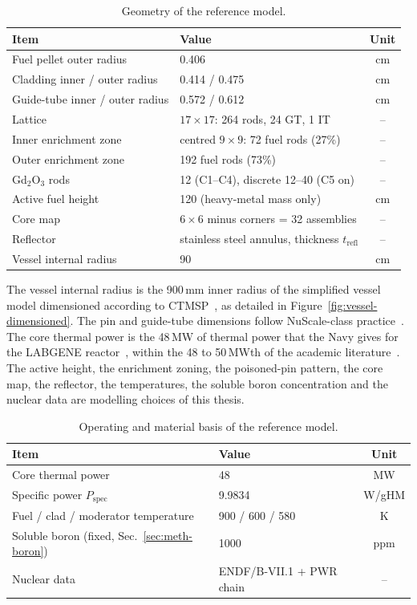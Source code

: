 \begin{table}[htbp]
  \centering
  \caption{Geometry of the reference model.}
  \label{tab:model-geometry}
  \begin{tabular}{llc}
    \toprule
    Item & Value & Unit \\
    \midrule
    Fuel pellet outer radius & 0.406 & cm \\
    Cladding inner / outer radius & 0.414 / 0.475 & cm \\
    Guide-tube inner / outer radius & 0.572 / 0.612 & cm \\
    Lattice & $17\times17$: 264 rods, 24 GT, 1 IT & -- \\
    Inner enrichment zone & centred $9\times9$: 72 fuel rods (27\%) & -- \\
    Outer enrichment zone & 192 fuel rods (73\%) & -- \\
    Gd$_2$O$_3$ rods & 12 (C1--C4), discrete 12--40 (C5 on) & -- \\
    Active fuel height & 120 (heavy-metal mass only) & cm \\
    Core map & $6\times6$ minus corners = 32 assemblies & -- \\
    Reflector & stainless steel annulus, thickness $t_\mathrm{refl}$ & -- \\
    Vessel internal radius & 90 & cm \\
    \bottomrule
  \end{tabular}
\end{table}

The vessel internal radius is the 900\,mm inner radius of the simplified
vessel model dimensioned according to CTMSP~\cite{maruyama_2013}, as
detailed in Figure~\ref{fig:vessel-dimensioned}. The pin
and guide-tube dimensions follow NuScale-class
practice~\cite{nuscale_htp2_2017}. The core thermal power is the
48\,MW of thermal power that the Navy gives for the LABGENE
reactor~\cite{demartini_nuclep_2022}, within the 48 to 50\,MWth of the
academic literature~\cite{dinizcosta_2017}. The active height, the
enrichment zoning, the poisoned-pin pattern, the core map, the
reflector, the temperatures, the soluble boron concentration and the
nuclear data are modelling choices of this thesis.

\begin{table}[htbp]
  \centering
  \caption{Operating and material basis of the reference model.}
  \label{tab:model-operating}
  \begin{tabular}{llc}
    \toprule
    Item & Value & Unit \\
    \midrule
    Core thermal power & 48 & MW \\
    Specific power $P_\mathrm{spec}$ & 9.9834 & W/gHM \\
    Fuel / clad / moderator temperature & 900 / 600 / 580 & K \\
    Soluble boron (fixed, Sec.~\ref{sec:meth-boron}) & 1000 & ppm \\
    Nuclear data & ENDF/B-VII.1 + PWR chain & -- \\
    \bottomrule
  \end{tabular}
\end{table}

